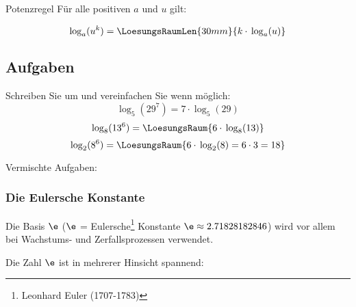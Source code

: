  \begin{gesetz}{Potenzregel}{}
   Für alle positiven $a$ und $u$ gilt:

   $$\log_a(u^k) = \LoesungsRaumLen{30mm}{k\cdot{} \log_a(u)}$$
 \end{gesetz}
\newpage 

 \subsection*{Aufgaben}

 \begin{center}
 \end{center}

 Schreiben Sie um und vereinfachen Sie wenn möglich:
 $$\log_5(29^7) = 7\cdot{}\log_5(29)$$
 $$\log_8(13^6) = \LoesungsRaum{6\cdot{}\log_8(13)}$$
 $$\log_2(8^6) = \LoesungsRaum{6\cdot{}\log_2(8) = 6\cdot{} 3 = 18}$$
 


Vermischte Aufgaben:



\newpage

 




\newpage


\subsubsection{Die Eulersche Konstante}

Die Basis $\e$ ($\e$ = Eulersche\footnote{Leonhard Euler (1707-1783)} Konstante $\e\approx 2.71828182846$) wird vor allem bei Wachstums- und Zerfallsprozessen verwendet.

Die Zahl $\e$ ist in mehrerer Hinsicht spannend:

